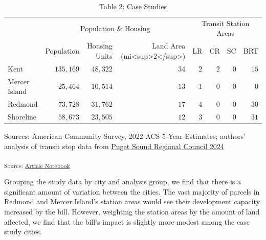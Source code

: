 \documentclass[
]{agujournal2019}
\begin{document}
\setlength{\LTpost}{0mm}
\begin{longtable}{l|rrrrrrr}
\caption{Table 2: Case Studies}\tabularnewline

\toprule
\multicolumn{1}{l}{} & \multicolumn{3}{c}{Population \& Housing} & \multicolumn{4}{c}{Transit Station Areas} \\ 
\cmidrule(lr){2-4} \cmidrule(lr){5-8}
\multicolumn{1}{l}{} & Population & Housing Units & Land Area (mi<sup>2</sup>) & LR & CR & SC & BRT \\ 
\midrule
Kent & $135,169$ & $48,322$ & $34$ & $2$ & $2$ & $0$ & $15$ \\ 
Mercer Island & $25,464$ & $10,514$ & $13$ & $1$ & $0$ & $0$ & $0$ \\ 
Redmond & $73,728$ & $31,762$ & $17$ & $4$ & $0$ & $0$ & $30$ \\ 
Shoreline & $58,673$ & $23,505$ & $12$ & $3$ & $0$ & $0$ & $31$ \\ 
\bottomrule
\end{longtable}
\begin{minipage}{\linewidth}
Sources: American Community Survey, 2022 ACS 5-Year Estimates; authors' analysis of transit stop data from \protect\hyperlink{ref-pugetsoundregionalcouncil2024}{Puget Sound Regional Council 2024}\\
\end{minipage}

\textsubscript{Source:
\href{https://tiernanmartin.github.io/2024-transit-oriented-development-bill/index.qmd.html}{Article
Notebook}}

Grouping the study data by city and analysis group, we find that there
is a significant amount of variation between the cities. The vast
majority of parcels in Redmond and Mercer Island's station areas would
see their development capacity increased by the bill. However, weighting
the station areas by the amount of land affected, we find that the
bill's impact is slightly more modest among the case study cities.
\end{document}
